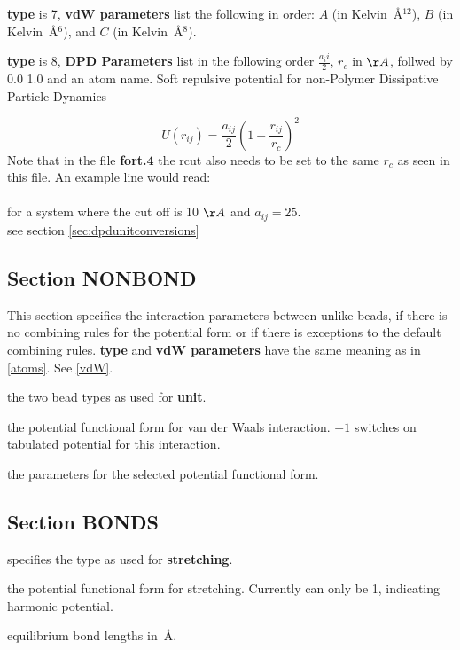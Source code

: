 \documentclass[12pt,letterpaper]{article}
\begin{document}
{\bf type} is 7, {\bf vdW parameters} list the following in
order: $A$ (in Kelvin~\AA$^{12}$), $B$ (in Kelvin~\AA$^6$),
and $C$ (in Kelvin~\AA$^8$).

{\bf type} is 8, {\bf DPD Parameters} list in the following order $\frac{a_ii}{2}$, $r_c$ in $\AA$, follwed by 0.0 1.0 and an atom name. Soft repulsive potential for non-Polymer Dissipative Particle Dynamics

\begin{equation}
U\left(r_{ij}\right) = \frac{a_{ij}}{2}\left(1-\frac{r_{ij}}{r_c}\right)^2
\end{equation}
Note that in the file {\bf fort.4} the rcut also needs to be set to the same $r_c$ as seen in this file. An example line would read: \\  \\ for a system where the cut off is 10 $\AA$ and $a_{ij} = 25$. \\ see section \ref{sec:dpdunitconversions}

\subsection{Section \textbf{NONBOND}}
\label{nonbond}
This section specifies the interaction parameters between
unlike beads, if there is no combining rules for the
potential form or if there is exceptions to the default
combining rules. {\bf type} and {\bf vdW parameters} have
the same meaning as in \ref{atoms}. See \ref{vdW}.

 the two bead types as used for {\bf
  unit}.

 the potential functional form for van
der Waals interaction. $-1$ switches on tabulated potential
for this interaction.

 the parameters for the
selected potential functional form.

\subsection{Section \textbf{BONDS}}
\label{bonds}

 specifies the type as used for {\bf
  stretching}.

 the potential functional form for
stretching. Currently can only be 1, indicating harmonic
potential.

 equilibrium bond lengths in~\AA.
\end{document}
